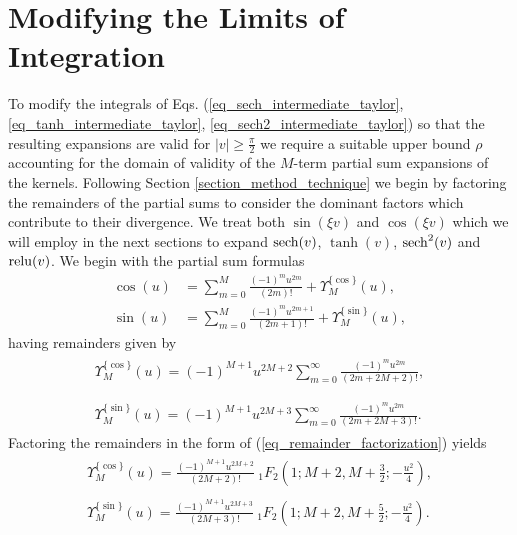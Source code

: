 \section{Modifying the Limits of Integration}
To modify the integrals of Eqs. (\ref{eq_sech_intermediate_taylor}, \ref{eq_tanh_intermediate_taylor}, \ref{eq_sech2_intermediate_taylor})
so that the resulting expansions are valid for $|v| \geq \frac{\pi}{2}$ we require
a suitable upper bound $\rho$ accounting for the domain of validity
of the $M$-term partial sum expansions of the kernels. Following Section
\ref{section_method_technique} we begin by factoring the remainders of
the partial sums to consider the dominant factors which contribute to
their divergence. We treat both  $\sin(\xi v)$ and $\cos(\xi v)$ which
we will employ in the next sections to expand $\operatorname{sech}(v)$, $\tanh(v)$, $\operatorname{sech}^2(v)$ and $\operatorname{relu}(v)$.
We begin with the partial sum formulas
\begin{align}
	\cos(u) &= 
	\sum_{m=0}^{M}\frac{(-1)^m u^{2 m}}{(2 m)!}
	+ \Upsilon_M^{\{\cos\}}(u), \label{eq_partial_sum_cos} \\
	\sin(u) &= 
	\sum_{m=0}^{M}\frac{(-1)^m u^{2 m + 1}}{(2 m + 1)!}
	+ \Upsilon_M^{\{\sin\}}(u), \label{eq_partial_sum_sin}
\end{align}
having remainders given by
\begin{align}
	\begin{split}
		\Upsilon_M^{\{\cos\}}(u) = 
		(-1)^{M+1} u^{2M+2}
		\sum_{m=0}^{\infty}
		\frac{(-1)^m u^{2m}}{(2m+2M+2)!}, \\
	\end{split}
	\\
	\begin{split}
		\Upsilon_M^{\{\sin\}}(u) = 
		(-1)^{M+1} u^{2M+3}
		\sum_{m=0}^{\infty}
		\frac{(-1)^m u^{2 m}}{(2m+2M+3)!}.
	\end{split}
\end{align}
Factoring the remainders in the form of
(\ref{eq_remainder_factorization}) yields
\begin{align}
	\begin{split}
		\Upsilon_M^{\{\cos\}}(u) = 
		\frac{(-1)^{M+1} u^{2M+2}}{(2M + 2)!}
		\ {}_{1}F_{2}
		\left(1; M+2, M+\frac{3}{2}; -\frac{u^2}{4}\right), 
		\label{eq_cos_remainder_hypergemom}
	\end{split}
	\\
	\begin{split}
		\Upsilon_M^{\{\sin\}}(u) = 
		\frac{(-1)^{M+1} u^{2M+3}}{(2M+3)!}
		\ {}_{1}F_{2}
		\left(1; M+2, M+\frac{5}{2}; -\frac{u^2}{4}\right)
		\label{eq_sin_remainder_hypergeom}.
	\end{split}
\end{align}


